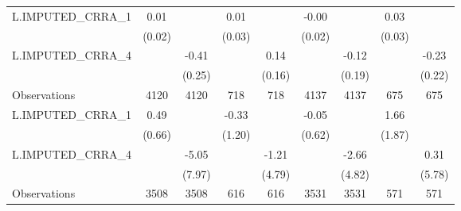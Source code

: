 {\begin{tabular}{l*{8}{c}}
\midrule
L.IMPUTED\_CRRA\_1&     0.01         &                  &     0.01         &                  &    -0.00         &                  &     0.03         &                  \\
                &   (0.02)         &                  &   (0.03)         &                  &   (0.02)         &                  &   (0.03)         &                  \\
\addlinespace
L.IMPUTED\_CRRA\_4&                  &    -0.41         &                  &     0.14         &                  &    -0.12         &                  &    -0.23         \\
                &                  &   (0.25)         &                  &   (0.16)         &                  &   (0.19)         &                  &   (0.22)         \\
\midrule
Observations    &     4120         &     4120         &      718         &      718         &     4137         &     4137         &      675         &      675         \\



\midrule
L.IMPUTED\_CRRA\_1&     0.49         &                  &    -0.33         &                  &    -0.05         &                  &     1.66         &                  \\
                &   (0.66)         &                  &   (1.20)         &                  &   (0.62)         &                  &   (1.87)         &                  \\
\addlinespace
L.IMPUTED\_CRRA\_4&                  &    -5.05         &                  &    -1.21         &                  &    -2.66         &                  &     0.31         \\
                &                  &   (7.97)         &                  &   (4.79)         &                  &   (4.82)         &                  &   (5.78)         \\
\midrule
Observations    &     3508         &     3508         &      616         &      616         &     3531         &     3531         &      571         &      571         \\




\end{tabular}}
